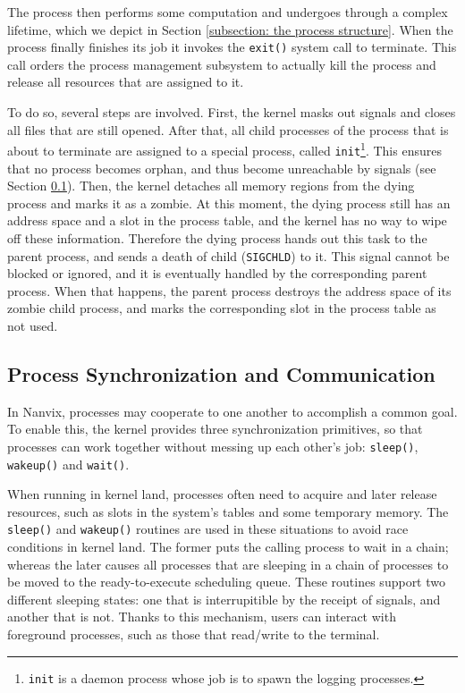\documentclass[10pt,a4paper]{article}
\begin{document}
The process then performs some computation and undergoes through a complex lifetime, which we depict in Section \ref{subsection: the process structure}. When the process finally finishes its job it invokes the \texttt{exit()} system call to terminate. This call orders the process management subsystem to actually kill the process and release all resources that are assigned to it.

To do so, several steps are involved. First, the kernel masks out signals and closes all files that are still opened. After that, all child processes of the process that is about to terminate are assigned to a special process, called \texttt{init}\footnote{\texttt{init} is a daemon process whose job is to spawn the logging processes.}. This ensures that no process becomes orphan, and thus become unreachable by signals (see Section \ref{subsection: process synchronization and communication}). Then, the kernel detaches all memory regions from the dying process and marks it as a zombie. At this moment, the dying process still has an address space and a slot in the process table, and the kernel has no way to wipe off these information. Therefore the dying process hands out this task to the parent process, and sends a death of child (\texttt{SIGCHLD}) to it. This signal cannot be 
blocked or ignored, and it is eventually handled by the corresponding parent process. When that happens, the parent process destroys the address space of its zombie child process, and marks the corresponding slot in the process table as not used.

\subsection{Process Synchronization and Communication}
\label{subsection: process synchronization and communication}

In Nanvix, processes may cooperate to one another to accomplish a common goal. To enable this, the kernel provides three synchronization primitives, so that processes can work together without messing up each other's job: \texttt{sleep()}, \texttt{wakeup()} and \texttt{wait()}.

When running in kernel land, processes often need to acquire and later release resources, such as slots in the system's tables and some temporary memory. The \texttt{sleep()} and \texttt{wakeup()} routines are used in these situations to avoid race conditions in kernel land. The former puts the calling process to wait in a chain; whereas the later causes all processes that are sleeping in a chain of processes to be moved to the ready-to-execute scheduling queue. These routines support two different sleeping states: one that is interrupitible by the receipt of signals, and another that is not. Thanks to this mechanism, users can interact with foreground processes, such as those that read/write to the terminal.
\end{document}
